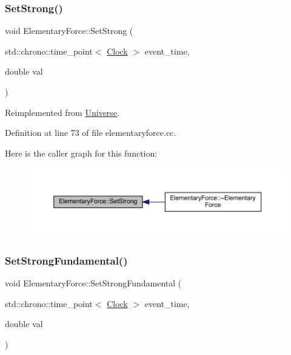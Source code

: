 \subsubsection{\texorpdfstring{Set\+Strong()}{SetStrong()}}
{\footnotesize\ttfamily void Elementary\+Force\+::\+Set\+Strong (\begin{DoxyParamCaption}\item[{std\+::chrono\+::time\+\_\+point$<$ \hyperlink{universe_8h_a0ef8d951d1ca5ab3cfaf7ab4c7a6fd80}{Clock} $>$}]{event\+\_\+time,  }\item[{double}]{val }\end{DoxyParamCaption})\hspace{0.3cm}{\ttfamily [virtual]}}



Reimplemented from \hyperlink{class_universe_a5946c8f3d4cda305f3ecd10df21a2f94}{Universe}.



Definition at line 73 of file elementaryforce.\+cc.

Here is the caller graph for this function\+:
\nopagebreak
\begin{figure}[H]
\begin{center}
\leavevmode
\includegraphics[width=350pt]{class_elementary_force_aa1b5708cfab2069049fec5c924e1f246_icgraph}
\end{center}
\end{figure}
\mbox{\label{class_elementary_force_afb00e9a10ec33eeb1daefce39b0468b7}} 
\subsubsection{\texorpdfstring{Set\+Strong\+Fundamental()}{SetStrongFundamental()}}
{\footnotesize\ttfamily void Elementary\+Force\+::\+Set\+Strong\+Fundamental (\begin{DoxyParamCaption}\item[{std\+::chrono\+::time\+\_\+point$<$ \hyperlink{universe_8h_a0ef8d951d1ca5ab3cfaf7ab4c7a6fd80}{Clock} $>$}]{event\+\_\+time,  }\item[{double}]{val }\end{DoxyParamCaption})\hspace{0.3cm}{\ttfamily [virtual]}}



